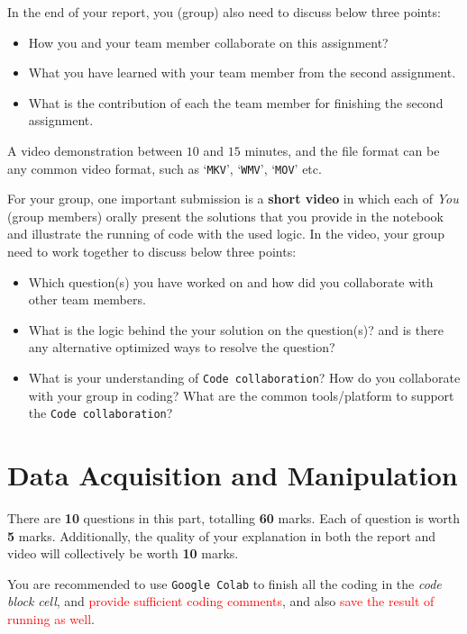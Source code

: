 \documentclass[a4paper]{article}
\begin{document}
\begin{description}
In the end of your report,
you (group) also need to discuss below three points:
\begin{itemize}
    \item How you and your team member collaborate on this assignment?
    \item What you have learned with your team member from the second assignment.
    \item What is the contribution of each the team member for finishing the second assignment.
\end{itemize}

\item[\texttt{SIT742Task2video.avi}]
A video demonstration between $10$ and $15$ minutes,
and the file format can be any common video format,
such as `\texttt{MKV}', `\texttt{WMV}', `\texttt{MOV}' etc.

For your group,
one important submission is a \textbf{short video}
in which each of \emph{You} (group members) orally present the solutions
that you provide in the notebook
and illustrate the running of code with the used logic.
In the video,
your group need to work together to discuss below three points:
\begin{itemize}
    \item Which question(s) you have worked on and how did you collaborate with other team members.
    \item What is the logic behind the your solution on the question(s)? and is there any alternative optimized ways to resolve the question?
    \item What is your understanding of \texttt{Code collaboration}? How do you collaborate with your group in coding? What are the common tools/platform to support the \texttt{Code collaboration}?
\end{itemize}
\end{description}



    \part{Data Acquisition and Manipulation}\label{sec:part1}

    There are \textbf{10} questions in this part, totalling \textbf{60} marks.
    Each of question is worth \textbf{5} marks. Additionally, the quality of your explanation in both the report and video will collectively be worth \textbf{10} marks.


    You are recommended to use \texttt{Google Colab} to
    finish all the coding in the \textit{code block cell},
    and \textcolor{red}{provide sufficient coding comments},
    and also \textcolor{red}{save the result of running as well}.
\end{document}
